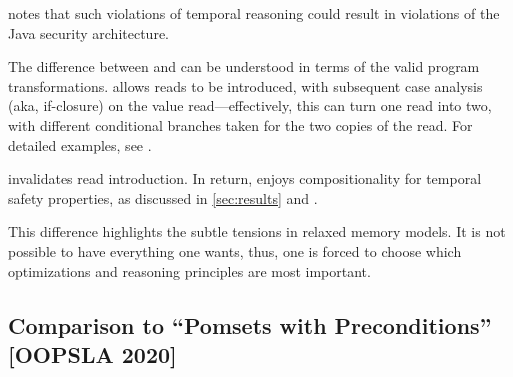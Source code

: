 \citet[Fig.~8]{DBLP:journals/toplas/Lochbihler13} notes that such violations
of temporal reasoning could result in violations of the Java security
architecture.

The difference between \PS{} and \PwT{} can be understood in terms of the
valid program transformations.  \PS{} allows reads to be introduced, with
subsequent case analysis (aka, if-closure) on the value read---effectively,
this can turn one read into two, with different conditional branches taken
for the two copies of the read.  For detailed examples, see
\cite{promising-ldrf}.

\PwT{} invalidates read introduction.  In return, \PwT{} enjoys
compositionality for temporal safety properties, as discussed in
\textsection\ref{sec:results} and
\cite[]{DBLP:journals/pacmpl/JagadeesanJR20}.

This difference highlights the subtle tensions in relaxed memory models.
It is not possible to have everything one wants, thus, one is forced
to choose which optimizations and reasoning principles are most important.









\subsection{Comparison to ``Pomsets with Preconditions'' [OOPSLA 2020]}
\label{sec:diff}


